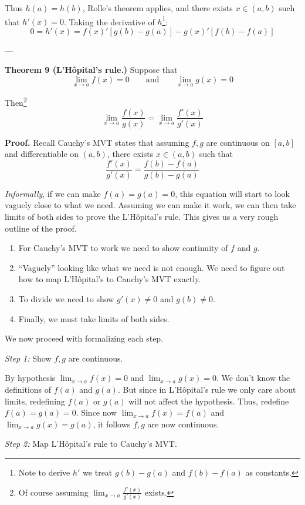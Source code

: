 Thus $h(a)=h(b)$, Rolle's theorem applies, and there exists
$x\in(a,b)$ such that $h'(x)=0$. Taking the derivative of
$h$\footnote{Note to derive $h'$ we treat $g(b)-g(a)$ and $f(b)-f(a)$
  as constants.}:
\[0=h'(x)=f(x)'[g(b)-g(a)]-g(x)'[f(b)-f(a)]\]

---\vs

\textbf{Theorem 9 (L'H\^opital's rule.)} Suppose that
\[\lim_{x\to a}f(x)=0\qquad\text{and}\qquad\lim_{x\to a}g(x)=0\]

Then\footnote{Of course assuming $\lim_{x\to a}\frac{f'(x)}{g'(x)}$ exists.}
\[\lim_{x\to a}\frac{f(x)}{g(x)}=\lim_{x\to a}\frac{f'(x)}{g'(x)}\]

\textbf{Proof.} Recall Cauchy's MVT states that assuming $f,g$ are
continuous on $[a,b]$ and differentiable on $(a,b)$, there exists
$x\in(a,b)$ such that
\[\frac{f'(x)}{g'(x)}=\frac{f(b)-f(a)}{g(b)-g(a)}\]

\textit{Informally}, if we can make $f(a)=g(a)=0$, this equation will
start to look vaguely close to what we need. Assuming we can make it
work, we can then take limits of both sides to prove the L'H\^opital's
rule. This gives us a very rough outline of the proof.
\begin{enumerate}
\item For Cauchy's MVT to work we need to show continuity of $f$ and
  $g$.
\item ``Vaguely'' looking like what we need is not enough. We need to
  figure out how to map L'H\^opital's to Cauchy's MVT exactly.
\item To divide we need to show $g'(x)\neq0$ and $g(b)\neq0$.
\item Finally, we must take limits of both sides.
\end{enumerate}

We now proceed with formalizing each step.

\vs

\textit{Step 1:} Show $f,g$ are continuous.

\vs

By hypothesis $\lim_{x\to a}f(x)=0$ and $\lim_{x\to a}g(x)=0$. We don't
know the definitions of $f(a)$ and $g(a)$. But since in L'H\^opital's
rule we only care about limits, redefining $f(a)$ or $g(a)$ will not
affect the hypothesis. Thus, redefine $f(a)=g(a)=0$. Since now
$\lim_{x\to a}f(x)=f(a)$ and $\lim_{x\to a}g(x)=g(a)$, it follows
$f,g$ are now continuous.

\vs

\textit{Step 2:} Map L'H\^opital's rule to Cauchy's MVT.

